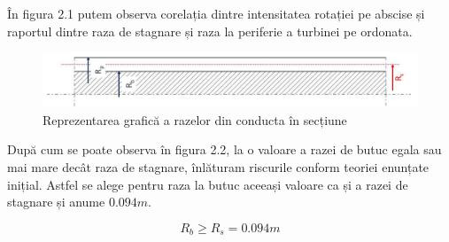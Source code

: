 În figura 2.1 putem observa corelația dintre intensitatea rotației pe abscise și raportul dintre raza de stagnare și raza la periferie a turbinei pe ordonata.

\begin{figure}[h!]
	\centering
	\includegraphics[scale=0.5]{figures/radii.jpg}
	\caption{Reprezentarea grafică a razelor din conducta în secțiune \cite{susanhub}}
	\label{Reprezentarea grafică a razelor din conducta în secțiune}
\end{figure}

După cum se poate observa în figura 2.2, la o valoare a razei de butuc egala sau mai mare decât raza de stagnare, înlăturam riscurile conform teoriei enunțate inițial. Astfel se alege pentru raza la butuc aceeași valoare ca și a razei de stagnare și anume $0.094\si{m}$.

\begin{equation}
R_b \geq R_s = 0.094\si{m}
\end{equation}

\clearpage